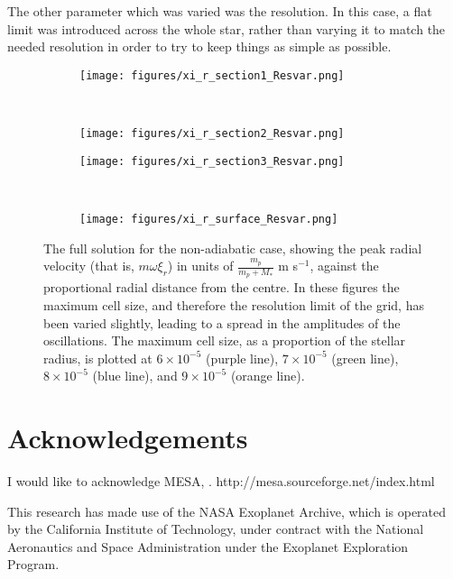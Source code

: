 \documentclass[11pt]{amsart}
\begin{document}
The other parameter which was varied was the resolution.  In this case, a flat limit was introduced across the whole star, rather than varying it to match the needed resolution in order to try to keep things as simple as possible.




\begin{figure}[htbp]
\begin{center}
\begin{subfigure}{0.5\textwidth}
\texttt{[image: figures/xi\_r\_section1\_Resvar.png]}
\end{subfigure}
~
\begin{subfigure}{0.5\textwidth}
\texttt{[image: figures/xi\_r\_section2\_Resvar.png]}
\end{subfigure}

\begin{subfigure}{0.5\textwidth}
\texttt{[image: figures/xi\_r\_section3\_Resvar.png]}
\end{subfigure}
~
\begin{subfigure}{0.5\textwidth}
\texttt{[image: figures/xi\_r\_surface\_Resvar.png]}
\end{subfigure}

\caption{The full solution for the non-adiabatic case, showing the peak radial velocity (that is, $m \omega \xi_{r}$) in units of $\frac{m_{p}}{m_{p} + M_{*}}$ m s$^{-1}$, against the proportional radial distance from the centre.  In these figures the maximum cell size, and therefore the resolution limit of the grid, has been varied slightly, leading to a spread in the amplitudes of the oscillations.  The maximum cell size, as a proportion of the stellar radius, is plotted at $6 \times 10^{-5}$ (purple line), $7 \times 10^{-5}$ (green line), $8 \times 10^{-5}$ (blue line), and $9 \times 10^{-5}$ (orange line).}
\label{fig:Dvar}
\end{center}
\end{figure}




\section{Acknowledgements}  \label{Acknowledgements}

I would like to acknowledge MESA, \cite{Paxton2011}. http://mesa.sourceforge.net/index.html

This research has made use of the NASA Exoplanet Archive, which is operated by the California Institute of Technology, under contract with the National Aeronautics and Space Administration under the Exoplanet Exploration Program.
\end{document}
